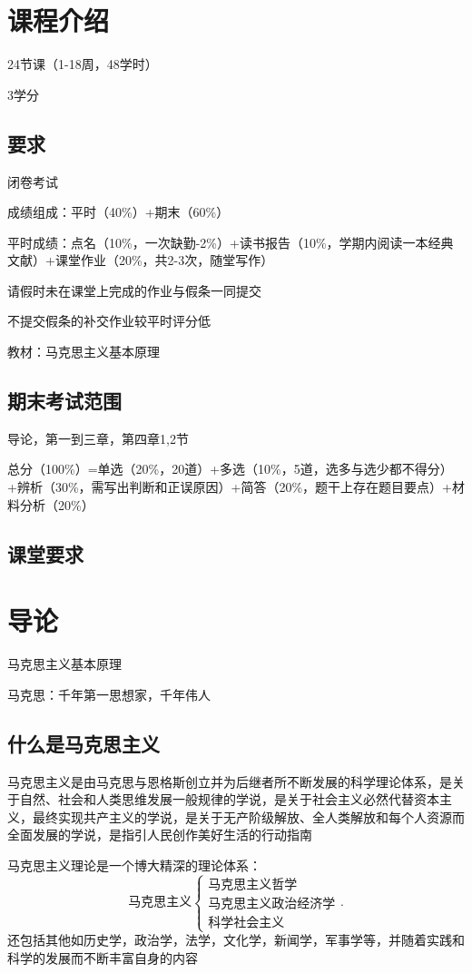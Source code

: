 \section*{课程介绍}%
\label{subsub:课程介绍}
24节课（1-18周，48学时）

3学分

\subsection*{要求}%
\label{sub:要求}
闭卷考试

成绩组成：平时（40\%）+期末（60\%）

平时成绩：点名（10\%，一次缺勤-2\%）+读书报告（10\%，学期内阅读一本经典文献）+课堂作业（20\%，共2-3次，随堂写作）

请假时未在课堂上完成的作业与假条一同提交

不提交假条的补交作业较平时评分低

教材：马克思主义基本原理

\subsection*{期末考试范围}%
\label{sub:期末考试范围}
导论，第一到三章，第四章1,2节

总分（100\%）=单选（20\%，20道）+多选（10\%，5道，选多与选少都不得分）+辨析（30\%，需写出判断和正误原因）+简答（20\%，题干上存在题目要点）+材料分析（20\%）
\subsection*{课堂要求}%
\label{sub:课堂要求}

\section{导论}%
\label{sec:导论}
马克思主义基本原理

马克思：千年第一思想家，千年伟人
\subsection{什么是马克思主义}%
\label{sub:什么是马克思主义}
\begin{notation}
    马克思主义是由马克思与恩格斯创立并为后继者所不断发展的科学理论体系，是关于自然、社会和人类思维发展一般规律的学说，是关于社会主义必然代替资本主义，最终实现共产主义的学说，是关于无产阶级解放、全人类解放和每个人资源而全面发展的学说，是指引人民创作美好生活的行动指南
\end{notation}
马克思主义理论是一个博大精深的理论体系：
\[
    \text{马克思主义}
    \begin{cases}
        \text{马克思主义哲学}\\ 
        \text{马克思主义政治经济学}\\ 
        \text{科学社会主义}
    \end{cases}
.\] 
还包括其他如历史学，政治学，法学，文化学，新闻学，军事学等，并随着实践和科学的发展而不断丰富自身的内容

